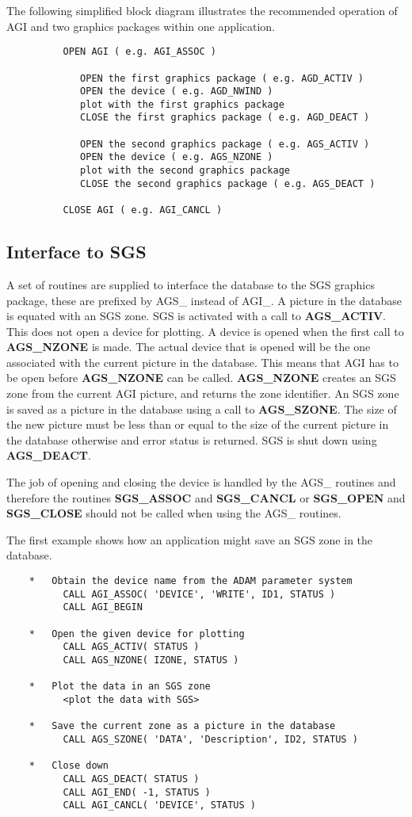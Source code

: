 The following simplified block diagram illustrates the recommended operation
of AGI and two graphics packages within one application.
\begin{verbatim}
          OPEN AGI ( e.g. AGI_ASSOC )

             OPEN the first graphics package ( e.g. AGD_ACTIV )
             OPEN the device ( e.g. AGD_NWIND )
             plot with the first graphics package
             CLOSE the first graphics package ( e.g. AGD_DEACT )

             OPEN the second graphics package ( e.g. AGS_ACTIV )
             OPEN the device ( e.g. AGS_NZONE )
             plot with the second graphics package
             CLOSE the second graphics package ( e.g. AGS_DEACT )

          CLOSE AGI ( e.g. AGI_CANCL )
\end{verbatim}

\subsection{Interface to SGS}

A set of routines are supplied to interface the database to the SGS graphics
package, these are prefixed by AGS\_ instead of AGI\_.
A picture in the database is equated with an SGS zone.
SGS is activated with a call to {\bf AGS\_ACTIV}.
This does not open a device for plotting.
A device is opened when the first call to {\bf AGS\_NZONE} is made.
The actual device that is opened will be the one associated with the
current picture in the database.
This means that AGI has to be open before {\bf AGS\_NZONE} can be called.
{\bf AGS\_NZONE} creates an SGS zone from the current AGI picture, and returns
the zone identifier.
An SGS zone is saved as a picture in the database using a call to
{\bf AGS\_SZONE}. The size of the new picture must be less than or equal
to the size of the current picture in the database otherwise and error
status is returned.
SGS is shut down using {\bf AGS\_DEACT}.

The job of opening and closing the device is handled by the AGS\_ routines
and therefore the routines {\bf SGS\_ASSOC} and {\bf SGS\_CANCL} or
{\bf SGS\_OPEN} and {\bf SGS\_CLOSE} should not be called when using the
AGS\_ routines.

The first example shows how an application might save an SGS zone in the
database.
\begin{verbatim}
    *   Obtain the device name from the ADAM parameter system
          CALL AGI_ASSOC( 'DEVICE', 'WRITE', ID1, STATUS )
          CALL AGI_BEGIN

    *   Open the given device for plotting
          CALL AGS_ACTIV( STATUS )
          CALL AGS_NZONE( IZONE, STATUS )

    *   Plot the data in an SGS zone
          <plot the data with SGS>

    *   Save the current zone as a picture in the database
          CALL AGS_SZONE( 'DATA', 'Description', ID2, STATUS )

    *   Close down
          CALL AGS_DEACT( STATUS )
          CALL AGI_END( -1, STATUS )
          CALL AGI_CANCL( 'DEVICE', STATUS )
\end{verbatim}

